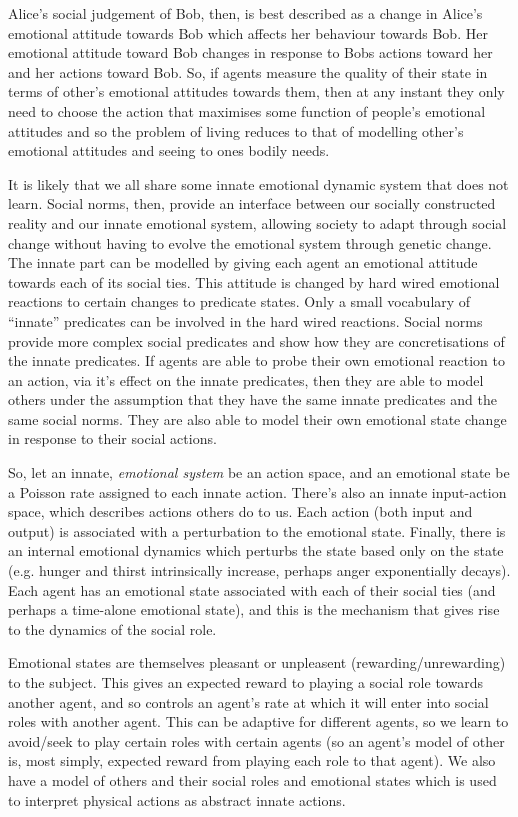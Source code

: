 \documentclass[a4paper]{article}
\begin{document}
Alice's social judgement of Bob, then, is best described as a change in Alice's emotional attitude towards Bob which affects her behaviour towards Bob. Her emotional attitude toward Bob changes in response to Bobs actions toward her and her actions toward Bob. So, if agents measure the quality of their state in terms of other's emotional attitudes towards them, then at any instant they only need to choose the action that maximises some function of people's emotional attitudes and so the problem of living reduces to that of modelling other's emotional attitudes and seeing to ones bodily needs.

It is likely that we all share some innate emotional dynamic system that does not learn. Social norms, then, provide an interface between our socially constructed reality and our innate emotional system, allowing society to adapt through social change without having to evolve the emotional system through genetic change. The innate part can be modelled by giving each agent an emotional attitude towards each of its social ties. This attitude is changed by hard wired emotional reactions to certain changes to predicate states. Only a small vocabulary of ``innate'' predicates can be involved in the hard wired reactions. Social norms provide more complex social predicates and show how they are concretisations of the innate predicates. If agents are able to probe their own emotional reaction to an action, via it's effect on the innate predicates, then they are able to model others under the assumption that they have the same innate predicates and the same social norms. They are also able to model their own emotional state change in response to their social actions.

So, let an innate, \textit{emotional system} be an action space, and an emotional state be a Poisson rate assigned to each innate action. There's also an innate input-action space, which describes actions others do to us. Each action (both input and output) is associated with a perturbation to the emotional state. Finally, there is an internal emotional dynamics which perturbs the state based only on the state (e.g. hunger and thirst intrinsically increase, perhaps anger exponentially decays). Each agent has an emotional state associated with each of their social ties (and perhaps a time-alone emotional state), and this is the mechanism that gives rise to the dynamics of the social role.

Emotional states are themselves pleasant or unpleasent (rewarding/unrewarding) to the subject. This gives an expected reward to playing a social role towards another agent, and so controls an agent's rate at which it will enter into social roles with another agent. This can be adaptive for different agents, so we learn to avoid/seek to play certain roles with certain agents (so an agent's model of other is, most simply, expected reward from playing each role to that agent). We also have a model of others and their social roles and emotional states which is used to interpret physical actions as abstract innate actions. 
\end{document}
